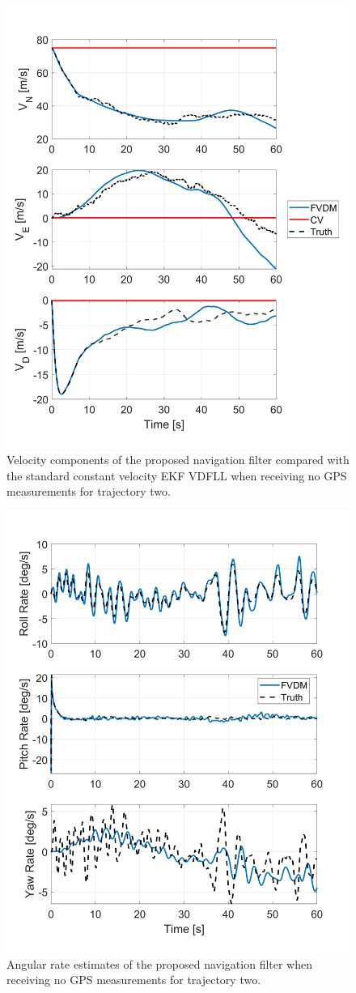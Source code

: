 \documentclass[12pt]{report}
\begin{document}
\begin{figure}[!ht]
  \centering
  \includegraphics[width=0.6\linewidth]{Figures/NOGPS/NEDv.png}
  \caption{Velocity components of the proposed navigation filter compared with the standard constant velocity EKF VDFLL when receiving no GPS measurements for trajectory two.}\label{fig:NOGPSNEDv}
\end{figure}

\begin{figure}[!ht]
  \centering
  \includegraphics[width=0.6\linewidth]{Figures/NOGPS/ANG.png}
  \caption{Angular rate estimates of the proposed navigation filter when receiving no GPS measurements for trajectory two.}\label{fig:NOGPSANG}
\end{figure}
\end{document}
